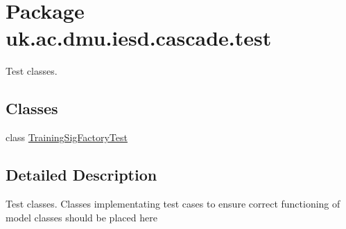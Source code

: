 \hypertarget{namespaceuk_1_1ac_1_1dmu_1_1iesd_1_1cascade_1_1test}{\section{Package uk.\-ac.\-dmu.\-iesd.\-cascade.\-test}
\label{namespaceuk_1_1ac_1_1dmu_1_1iesd_1_1cascade_1_1test}
}


Test classes.  


\subsection*{Classes}
\begin{DoxyCompactItemize}
\item 
class \hyperlink{classuk_1_1ac_1_1dmu_1_1iesd_1_1cascade_1_1test_1_1_training_sig_factory_test}{Training\-Sig\-Factory\-Test}
\end{DoxyCompactItemize}


\subsection{Detailed Description}
Test classes. Classes implementating test cases to ensure correct functioning of model classes should be placed here 